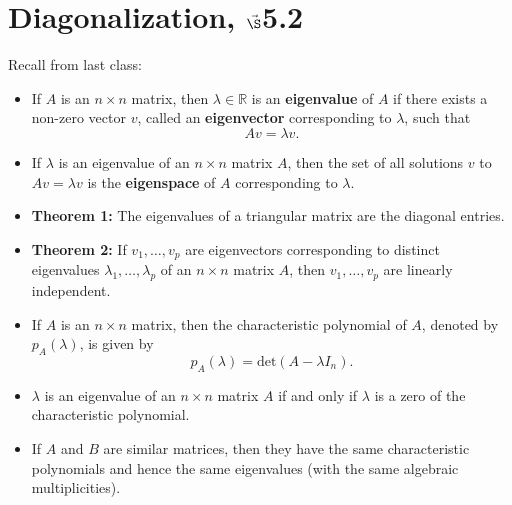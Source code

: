 


%
%
%

\section{{Diagonalization, $\vec\S$5.2}}%
% 

%
\thispagestyle{fancy}

Recall from last class:

\begin{itemize}
\item If $A$ is an $n \times n$ matrix, then $\lambda \in \mathbb{R}$ is an {\bf eigenvalue} of $A$ if there exists a non-zero vector $v$, called an {\bf eigenvector} corresponding to $\lambda$, such that $$Av=\lambda v.$$
\item If $\lambda$ is an eigenvalue of an $n \times n$ matrix $A$, then the set of all solutions $v$ to $Av = \lambda v$ is the {\bf eigenspace} of $A$ corresponding to $\lambda$.
\item {\bf Theorem 1:} The eigenvalues of a triangular matrix are the diagonal entries.
\item {\bf Theorem 2:} If $v_1, \dots, v_p$ are eigenvectors corresponding to distinct eigenvalues $\lambda_1, \dots, \lambda_p$ of an $n\times n$ matrix $A$, then $v_1, \dots, v_p$ are linearly independent.
\item If $A$ is an $n\times n$ matrix, then the characteristic polynomial of $A$, denoted by $p_A(\lambda)$, is given by $$p_A(\lambda)=\text{det}(A-\lambda I_n).$$
\item $\lambda$ is an eigenvalue of an $n\times n$ matrix $A$ if and only if $\lambda$ is a zero of the characteristic polynomial.
\item If $A$ and $B$ are similar matrices, then they have the same characteristic polynomials and hence the same eigenvalues (with the same algebraic multiplicities). 
\end{itemize}

\newpage

